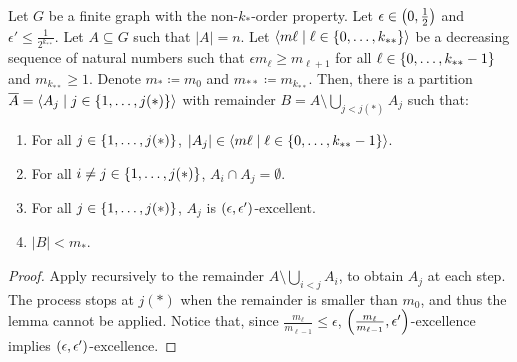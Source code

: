     \begin{lemma}[Claim 5.14.1] \label{lem:existance_of_excellent_partition}
        Let $G$ be a finite graph with the non-$k_{*}$-order property.
        Let $\epsilon \in \left( 0, \frac{1}{2} \right)$ and $\epsilon' \leq \frac{1}{2^{k_{**}}}$.
        Let $A \subseteq G$ such that $|A| = n$.
        Let $\left< m\ell \mid \ell \in \left\{ 0, \dots, k_{**} \right\} \right>$ be a decreasing sequence of natural numbers such that
        $\epsilon m_{\ell} \geq m_{\ell+1}$ for all $\ell \in \left\{ 0, \dots, k_{**}-1 \right\}$ and $m_{k_{**}} \geq 1$.
        Denote $m_* \coloneq m_0$ and $m_{**} \coloneq m_{k_{**}}$.
        Then, there is a partition $\overline{A} = \left< A_j \mid j \in \left\{ 1, \dots, j(*) \right\} \right>$ with remainder
        $B = A \setminus \bigcup_{j < j(*)} A_j$ such that:
        \begin{enumerate}[label=(\alph*), ref=\alph*]
            \item \label{itm:existance_of_excellent_partition.a} For all $j \in \left\{ 1, \dots, j(*) \right\}$, $|A_j| \in \left< m\ell \mid \ell \in \left\{ 0, \dots, k_{**}-1 \right\} \right>$.
            \item \label{itm:existance_of_excellent_partition.b} For all $i \neq j \in \left\{ 1, \dots, j(*) \right\}$, $A_i \cap A_j = \emptyset$.
            \item \label{itm:existance_of_excellent_partition.c} For all $j \in \left\{ 1, \dots, j(*) \right\}$, $A_j$ is $\left( \epsilon, \epsilon' \right)$-excellent.
            \item \label{itm:existance_of_excellent_partition.d} $|B| < m_*$.
        \end{enumerate}
        \begin{proof}
            Apply  recursively to the remainder
            $A \setminus \bigcup_{i < j} A_i$, to obtain $A_j$ at each step.
            The process stops at $j(*)$ when the remainder is smaller than $m_0$, and thus the lemma cannot be applied.
            Notice that, since $\frac{m_\ell}{m_{\ell-1}} \leq \epsilon$, $\left( \frac{m_\ell}{m_{\ell-1}}, \epsilon' \right)$-excellence
            implies $\left( \epsilon, \epsilon' \right)$-excellence.
        \end{proof}
    \end{lemma}


